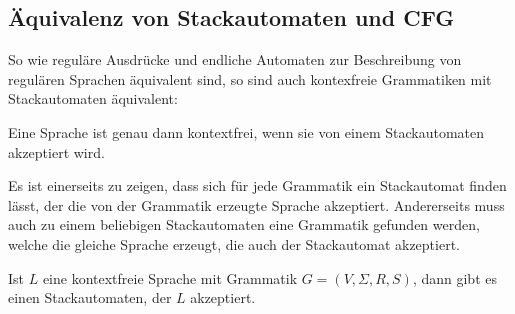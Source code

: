 \subsection{Äquivalenz von Stackautomaten und CFG\label{sect:aequivalenz-cfg}}
So wie reguläre Ausdrücke und endliche Automaten zur Beschreibung
von regulären Sprachen äquivalent sind, so sind auch kontexfreie Grammatiken
mit Stackautomaten äquivalent:

\begin{satz}
Eine Sprache ist genau dann kontextfrei, wenn sie von einem
Stackautomaten akzeptiert wird.
\end{satz}

Es ist einerseits zu zeigen, dass sich für jede Grammatik ein Stackautomat
finden lässt, der die von der Grammatik erzeugte Sprache akzeptiert.
Andererseits muss auch zu einem beliebigen Stackautomaten eine 
Grammatik gefunden werden, welche die gleiche Sprache erzeugt, die
auch der Stackautomat akzeptiert.

\begin{hilfssatz}\label{hilfssatz_cfg_to_pushdown}
Ist $L$ eine kontextfreie Sprache mit Grammatik $G=(V,\Sigma,R,S)$,
dann gibt es einen Stackautomaten, der $L$ akzeptiert.
\end{hilfssatz}

